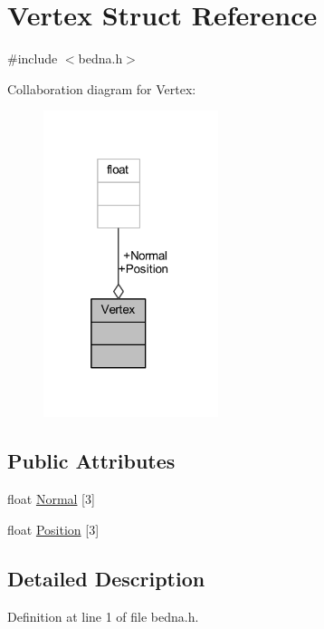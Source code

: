 \hypertarget{structVertex}{}\section{Vertex Struct Reference}
\label{structVertex}


{\ttfamily \#include $<$bedna.\+h$>$}



Collaboration diagram for Vertex\+:
\nopagebreak
\begin{figure}[H]
\begin{center}
\leavevmode
\includegraphics[width=145pt]{structVertex__coll__graph}
\end{center}
\end{figure}
\subsection*{Public Attributes}
\begin{DoxyCompactItemize}
\item 
float \mbox{\hyperlink{structVertex_a21d39482cfec221ea8ed9e9fab50b13e}{Normal}} \mbox{[}3\mbox{]}
\item 
float \mbox{\hyperlink{structVertex_a85b45e0a1f35880b510cd5c3cd5a5296}{Position}} \mbox{[}3\mbox{]}
\end{DoxyCompactItemize}


\subsection{Detailed Description}


Definition at line 1 of file bedna.\+h.



